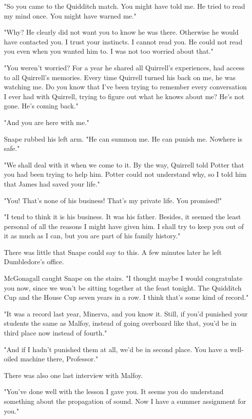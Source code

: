 "So you came to the Quidditch match. You might have told me. He tried to read my mind once. You might have warned me."

"Why? He clearly did not want you to know he was there. Otherwise he would have contacted you. I trust your instincts. I cannot read you. He could not read you even when you wanted him to. I was not too worried about that."

"You weren't worried? For a year he shared all Quirrell's experiences, had access to all Quirrell's memories. Every time Quirrell turned his back on me, he was watching me. Do you know that I've been trying to remember every conversation I ever had with Quirrell, trying to figure out what he knows about me? He's not gone. He's coming back."

"And you are here with me."

Snape rubbed his left arm. "He can summon me. He can punish me. Nowhere is safe."

"We shall deal with it when we come to it. By the way, Quirrell told Potter that you had been trying to help him. Potter could not understand why, so I told him that James had saved your life."

"You{\el}! That's none of his business! That's my private life. You promised!"

"I tend to think it is his business. It was his father. Besides, it seemed the least personal of all the reasons I might have given him. I shall try to keep you out of it as much as I can, but you are part of his family history."

There was little that Snape could say to this. A few minutes later he left Dumbledore's office.

McGonagall caught Snape on the stairs. "I thought maybe I would congratulate you now, since we won't be sitting together at the feast tonight. The Quidditch Cup and the House Cup seven years in a row. I think that's some kind of record."

"It was a record last year, Minerva, and you know it. Still, if you'd punished your students the same as Malfoy, instead of going overboard like that, you'd be in third place now instead of fourth."

"And if I hadn't punished them at all, we'd be in second place. You have a well-oiled machine there, Professor."

There was also one last interview with Malfoy.

"You've done well with the lesson I gave you. It seems you do understand something about the propagation of sound. Now I have a summer assignment for you."

